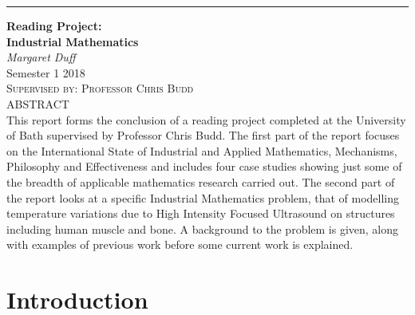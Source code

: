 \documentclass[11pt]{article} %
\begin{document}
	\begin{titlepage} %
	
	\raggedleft %
	
	\rule{1pt}{\textheight} %
	\hspace{0.05\textwidth} %
	\parbox[b]{0.75\textwidth}{ %
		
		{\Huge\bfseries Reading Project: \\[0.5\baselineskip] Industrial Mathematics}\\[2\baselineskip] %
		{\large\textit{Margaret Duff}}\\[3\baselineskip] %
		{\large{Semester 1 2018}}\\[3\baselineskip] %
		{\Large\textsc{Supervised by: Professor Chris Budd}}\\[4\baselineskip] %
		{ABSTRACT}\\[1\baselineskip]
		{This report forms the conclusion of a reading project completed at the University of Bath supervised by Professor Chris Budd. 
			The first part of the report focuses on the International State of Industrial and Applied Mathematics, Mechanisms, Philosophy and Effectiveness and includes four case studies showing just some of the breadth of applicable mathematics research carried out. The second part of the report looks at a specific Industrial Mathematics problem, that of modelling temperature variations due to High Intensity Focused Ultrasound on structures including human muscle and bone. A background to the problem is given, along with examples of previous work before some current work is explained.  }\\[4\baselineskip]			
	}
	
\end{titlepage}

\pagebreak
	\tableofcontents 
	\pagebreak
	\section{Introduction}
	
\end{document}

